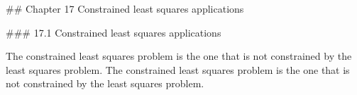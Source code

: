 

## Chapter 17 Constrained least squares applications

### 17.1 Constrained least squares applications

The constrained least squares problem is the one that is not constrained by the least squares problem. The constrained least squares problem is the one that is not constrained by the least squares problem.

